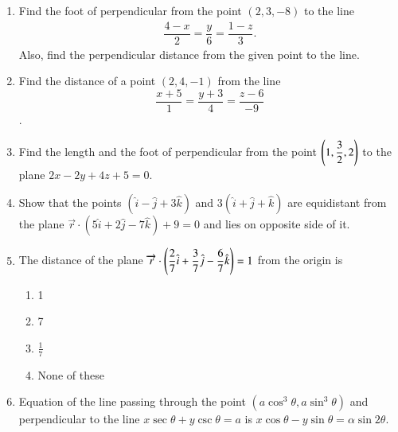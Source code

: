 \begin{enumerate}[label=\thesubsection.\arabic*,ref=\thesubsection.\theenumi]
\item Find the foot of perpendicular from the point $(2,3,-8)$ to the line  
\begin{align*}
	\dfrac{4-x}{2}=\dfrac{y}{6}=\dfrac{1-z}{3}.
\end{align*}
	Also, find the perpendicular distance from the given point to the line.
\item Find the distance of a point $(2,4,-1)$ from the line $$\frac{x+5}{1}=\frac{y+3}{4}=\frac{z-6}{-9}$$.
\item Find the length and the foot of perpendicular from the point $ \left(1,\dfrac{3}{2} ,2 \right)$ to the plane $2x-2y+4z+5=0.$
\item Show that the points $(\hat{i}-\hat{j}+3\hat{k})$ and $3(\hat{i}+\hat{j}+\hat{k})$ are equidistant from the plane $\overrightarrow{r} \cdot (5\hat{i}+2\hat{j}-7\hat{k})+9=0$ and lies on opposite side of it.
\item The distance of the plane $\overrightarrow{r} \cdot \left( \dfrac{2}{7}\hat{i}+\dfrac{3}{7}\hat{j}-\dfrac{6}{7}\hat{k}\right)=1$ from the origin is 
\begin{enumerate}
	\item 1
	\item 7
	\item $\frac{1}{7}$
	\item None of these	
\end{enumerate}
\item Equation of the line passing through the point $(a\cos^3\theta, a\sin^3\theta)$ and perpendicular to the line $x\sec\theta+y\csc\theta=a$ is $x\cos\theta-y\sin\theta=\alpha\sin2\theta$.
\end{enumerate}
